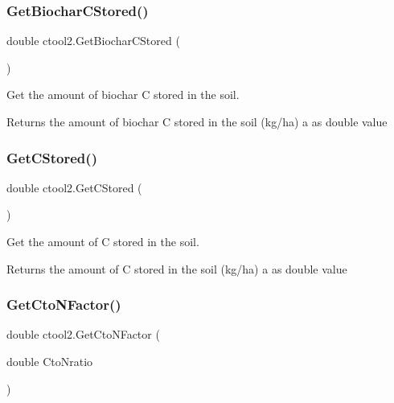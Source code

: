 \subsubsection{\texorpdfstring{GetBiocharCStored()}{GetBiocharCStored()}}
{\footnotesize\ttfamily double ctool2.\+Get\+Biochar\+C\+Stored (\begin{DoxyParamCaption}{ }\end{DoxyParamCaption})\hspace{0.3cm}{\ttfamily [inline]}}



Get the amount of biochar C stored in the soil. 

\begin{DoxyReturn}{Returns}
the amount of biochar C stored in the soil (kg/ha) a as double value 
\end{DoxyReturn}
\mbox{\label{classctool2_a4002bf436d8ceb479203d186315a66e9}} 
\subsubsection{\texorpdfstring{GetCStored()}{GetCStored()}}
{\footnotesize\ttfamily double ctool2.\+Get\+C\+Stored (\begin{DoxyParamCaption}{ }\end{DoxyParamCaption})\hspace{0.3cm}{\ttfamily [inline]}}



Get the amount of C stored in the soil. 

\begin{DoxyReturn}{Returns}
the amount of C stored in the soil (kg/ha) a as double value 
\end{DoxyReturn}
\mbox{\label{classctool2_a2376beb1addd3be35eb8a09213ab4003}} 
\subsubsection{\texorpdfstring{GetCtoNFactor()}{GetCtoNFactor()}}
{\footnotesize\ttfamily double ctool2.\+Get\+Cto\+N\+Factor (\begin{DoxyParamCaption}\item[{double}]{Cto\+Nratio }\end{DoxyParamCaption})\hspace{0.3cm}{\ttfamily [inline]}}




